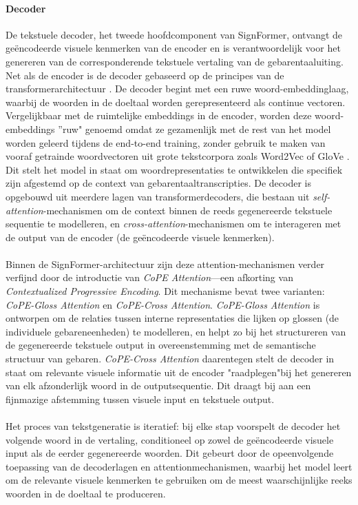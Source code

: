 \paragraph{Decoder}
De tekstuele decoder, het tweede hoofdcomponent van SignFormer, ontvangt de geëncodeerde visuele kenmerken van de encoder en is verantwoordelijk voor het genereren van de corresponderende tekstuele vertaling van de gebarentaaluiting.
Net als de encoder is de decoder gebaseerd op de principes van de transformerarchitectuur \autocite{vaswani2017attentionneed}.
De decoder begint met een ruwe woord-embeddinglaag, waarbij de woorden in de doeltaal worden gerepresenteerd als continue vectoren.
Vergelijkbaar met de ruimtelijke embeddings in de encoder, worden deze woord-embeddings ''ruw" \space genoemd omdat ze gezamenlijk met de rest van het model worden geleerd tijdens de end-to-end training, zonder gebruik te maken van vooraf getrainde woordvectoren uit grote tekstcorpora zoals Word2Vec \autocite{mikolov2013efficient} of GloVe \autocite{pennington2014glove}.
Dit stelt het model in staat om woordrepresentaties te ontwikkelen die specifiek zijn afgestemd op de context van gebarentaaltranscripties.
De decoder is opgebouwd uit meerdere lagen van transformerdecoders, die bestaan uit \emph{self-attention}-mechanismen om de context binnen de reeds gegenereerde tekstuele sequentie te modelleren, en \emph{cross-attention}-mechanismen om te interageren met de output van de encoder (de geëncodeerde visuele kenmerken).
\\
\\
Binnen de SignFormer-architectuur zijn deze attention-mechanismen verder verfijnd door de introductie van \emph{CoPE Attention}—een afkorting van \emph{Contextualized Progressive Encoding}.
Dit mechanisme bevat twee varianten: \emph{CoPE-Gloss Attention} en \emph{CoPE-Cross Attention}.
\emph{CoPE-Gloss Attention} is ontworpen om de relaties tussen interne representaties die lijken op glossen (de individuele gebareneenheden) te modelleren, en helpt zo bij het structureren van de gegenereerde tekstuele output in overeenstemming met de semantische structuur van gebaren.
\emph{CoPE-Cross Attention} daarentegen stelt de decoder in staat om relevante visuele informatie uit de encoder "raadplegen"\space  bij het genereren van elk afzonderlijk woord in de outputsequentie.
Dit draagt bij aan een fijnmazige afstemming tussen visuele input en tekstuele output.
\\
\\
Het proces van tekstgeneratie is iteratief: bij elke stap voorspelt de decoder het volgende woord in de vertaling, conditioneel op zowel de geëncodeerde visuele input als de eerder gegenereerde woorden.
Dit gebeurt door de opeenvolgende toepassing van de decoderlagen en attentionmechanismen, waarbij het model leert om de relevante visuele kenmerken te gebruiken om de meest waarschijnlijke reeks woorden in de doeltaal te produceren.

